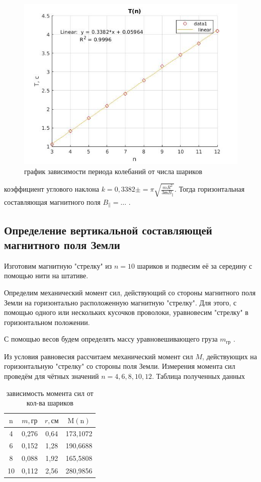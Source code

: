 \documentclass[a4paper, 12pt]{article}%
\begin{document}
\begin{figure}[h]
    \centering
    \includegraphics[width = 9 cm]{graph1_s.jpg}
    \caption{график зависимости периода колебаний от числа шариков}
    \label{msh1}
\end{figure}

коэффициент углового наклона $k = 0,3382 \pm = \pi \sqrt{\frac{m R^{2}}{3 \mathfrak{m} B_{\|}}}$. Тогда горизонтальная составляющая магнитного поля $B_{\|} = \dots $ .

\subsection{Определение вертикальной составляющей магнитного поля Земли}

Изготовим магнитную "стрелку" из $n = 10$ шариков и подвесим её за середину с помощью нити на штативе. 

Определим механический момент сил, действующий со стороны магнитного поля Земли на горизонтально расположенную магнитную "стрелку". Для этого, с помощью одного или нескольких кусоч­ков проволоки, уравновесим "стрелку" в горизонтальном положении.

С помощью весов будем определять массу уравновешивающего груза $m_{\text{гр}}$ .

Из условия равновесия рассчитаем механический момент сил $M$, действующих на горизонтальную "стрелку" со стороны поля Земли. Измерения момента сил проведём для чётных значений $n = 4, 6, 8, 10, 12$. Таблица полученных данных

\begin{table}[!h]
\begin{center}
\begin{tabular}{|c|c|c|c|}
\hline $\mathrm{n}$ & $m, \text{гр}$ & $r, \text{см}$ & $\mathrm{M}(\mathrm{n})$ \\
\hline 4 & 0,276 & 0,64 & 173,1072 \\
\hline 6 & 0,152 & 1,28 & 190,6688 \\
\hline 8 & 0,088 & 1,92 & 165,5808 \\
\hline 10 & 0,112 & 2,56 & 280,9856 \\
\hline
\end{tabular}
\caption{зависимость момента сил от кол-ва шариков}
\end{center}
\end{table}
\end{document}
